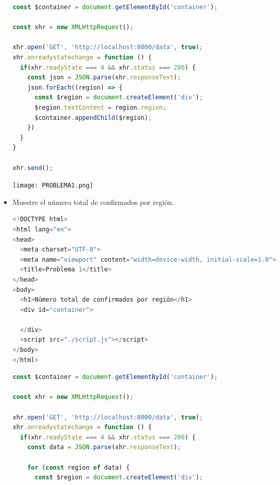 \documentclass{article}
\begin{document}
\begin{itemize}
            \begin{lstlisting}[language=JavaScript, caption=PROBLEMA1-SCRIPT]
const $container = document.getElementById('container');

const xhr = new XMLHttpRequest(); 

xhr.open('GET', 'http://localhost:8000/data', true);
xhr.onreadystatechange = function () {
  if(xhr.readyState === 4 && xhr.status === 200) {
    const json = JSON.parse(xhr.responseText);
    json.forEach((region) => {
      const $region = document.createElement('div');
      $region.textContent = region.region;
      $container.appendChild($region);
    })
  }
}

xhr.send();
            \end{lstlisting}  

            \newline \newline \newline
            \texttt{[image: PROBLEMA1.png]}
            \newline \newline \newline


            \item Muestre el número total de confirmados por región.

            \begin{lstlisting}[language=JavaScript, caption=PROBLEMA2-INDEX]
<!DOCTYPE html>
<html lang="en">
<head>
  <meta charset="UTF-8">
  <meta name="viewport" content="width=device-width, initial-scale=1.0">
  <title>Problema 1</title>
</head>
<body>
  <h1>Número total de confirmados por región</h1>
  <div id="container">

  </div>
  <script src="./script.js"></script>
</body>
</html>
            \end{lstlisting}  

            \begin{lstlisting}[language=JavaScript, caption=PROBLEMA2-SCRIPT]
const $container = document.getElementById('container');

const xhr = new XMLHttpRequest(); 

xhr.open('GET', 'http://localhost:8000/data', true);
xhr.onreadystatechange = function () {
  if(xhr.readyState === 4 && xhr.status === 200) {
    const data = JSON.parse(xhr.responseText);

    for (const region of data) {
      const $region = document.createElement('div');


\end{lstlisting}
\end{itemize}
\end{document}
